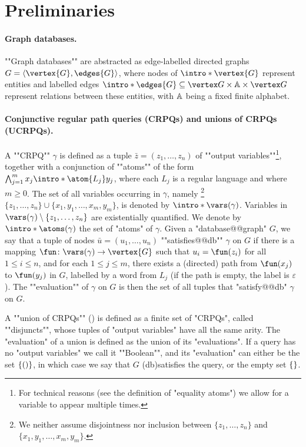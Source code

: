 \section{Preliminaries}
\label{sec-prelims}

\paragraph{Graph databases.}
\AP ""Graph databases"" are abstracted as edge-labelled directed graphs
$G = \langle \vertex{G}, \edges{G} \rangle$, 
where nodes of $\intro*\vertex{G}$ represent entities and labelled edges $\intro*\edges{G} \subseteq \vertex G \times \A \times \vertex G$
represent relations between these entities, with $\mathbb{A}$ being a fixed finite alphabet.

\paragraph{Conjunctive regular path queries (CRPQs) and unions of CRPQs (UCRPQs).}
\AP A ""CRPQ"" $\gamma$ is defined as a tuple $\bar z = (z_1,\hdots,z_n)$
of ""output variables""\footnote{For technical reasons (see the definition of "equality atoms") we allow for a variable to appear multiple times.},
together with a conjunction of ""atoms"" of the form
\AP$\bigwedge_{j=1}^m x_j \intro*\atom{L_j} y_j$, where each $L_j$ is a regular language
and where $m \geq 0$.
The set of all variables occurring in $\gamma$, namely%
\footnote{We neither assume 
disjointness nor inclusion between $\{z_1,\hdots,z_n\}$ and $\{x_1,y_1,\hdots,x_m,y_m\}$.}
$\{z_1,\hdots,z_n\}\cup\{x_1,y_1,\hdots,x_m,y_m\}$, is denoted by
$\intro*\vars(\gamma)$. Variables in $\vars(\gamma)\setminus \{z_1,\hdots,z_n\}$ are existentially quantified. 
We denote by $\intro*\atoms(\gamma)$ the set of "atoms" of $\gamma$.
Given a "database@@graph" $G$, we say that a tuple of nodes $\bar u = (u_1,\hdots,u_n)$
\AP""satisfies@@db"" $\gamma$ 
on $G$ if there is a mapping
$\fun\colon \vars(\gamma) \to \vertex{G}$ such that $u_i = \fun(z_i)$ for all
$1 \leq i \leq n$, and for each $1 \leq j \leq m$,
there exists a (directed) path from $\fun(x_j)$ to $\fun(y_j)$ in $G$, labelled by
a word from $L_j$ (if the path is empty, the label is $\varepsilon$). The \AP""evaluation"" of $\gamma$ on $G$ is then the set of all tuples that "satisfy@@db" $\gamma$ on $G$.

A ""union of CRPQs"" ()
is defined as a finite set of "CRPQs", called \AP""disjuncts"", whose tuples of "output variables" have all the same arity.
The "evaluation" of a union is defined as the union of its "evaluations". 
If a query has no "output variables" we call it ""Boolean"", and
its "evaluation" can either be the set $\{()\}$, in which case we say that $G$
\reintro(db){satisfies} the query, or the empty set $\{\}$.

